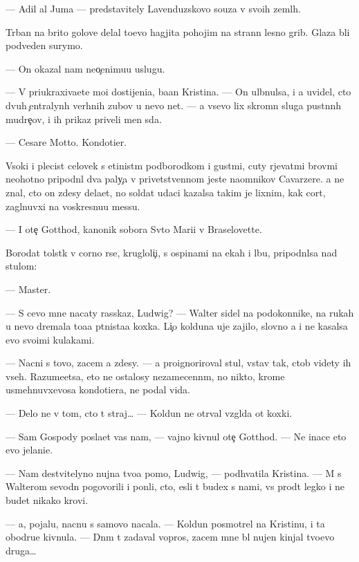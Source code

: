 \documentclass[10pt]{book}
\begin{document}
— Adil al Juma — predstavitely Lavenduzskovo so{\y}uza v svo{\y}ih zeml{\ia}h.

T{\iu}rban na brito{\y} golove delal to{\x}evo hagjita pohojim na strann{\yi}{\y} lesno{\y} grib. Glaza b{\yi}li podveden{\yi} surymo{\y}.

— On okazal nam neo{\c}enimu{\y}u uslugu.

— V{\yi} priukraxiva{\y}ete mo{\y}i dostijeni{\y}a, ba{\y}an Kristina. — On ul{\yi}bnulsa, i {\y}a uvidel, cto dvuh {\c}entralyn{\yi}h verhnih zubov u nevo net. — {\Y}a vsevo lix skromn{\yi}{\y} sluga pust{\yi}nn{\yi}h mudre{\c}ov, i ih prikaz{\yi} priveli men{\ia} s{\iu}da.

— Cesare Motto. Kondotier.

V{\yi}soki{\y} i plecist{\yi}{\y} celovek s {\x}etinist{\yi}m podborodkom i gust{\yi}mi, cuty r{\yi}jevat{\yi}mi brov{\ia}mi neohotno pripodn{\ia}l dva paly{\c}a v privetstvennom jeste na{\y}omnikov Cavarzere. {\Y}a ne znal, cto on zdesy dela{\y}et, no soldat udaci kazalsa takim je lixnim, kak cort, zagl{\ia}nuvxi{\y} na voskresnu{\y}u messu.

— I ote{\c} Gotthod, kanonik sobora Sv{\ia}to{\y} Mari{\y}i v Braselovette.

Borodat{\yi}{\y} tolst{\ia}k v corno{\y} r{\ia}se, krugloli{\c}i{\y}, s ospinami na {\x}ekah i lbu, pripodn{\ia}lsa nad stulom:

— Master.

— S cevo mne nacaty rasskaz, Ludwig? — Walter sidel na podokonnike, na rukah u nevo dremala to{\x}a{\y}a p{\ia}tnista{\y}a koxka. Li{\c}o kolduna uje zajilo, slovno {\y}a i ne kasalsa {\y}evo svo{\y}imi kulakami.

— Nacni s tovo, zacem {\y}a zdesy. — {\Y}a proignoriroval stul, vstav tak, ctob{\yi} videty ih vseh. Razume{\y}etsa, eto ne ostalosy nezamecenn{\yi}m, no nikto, krome usmehnuvxevosa kondotiera, ne podal vida.

— Delo ne v tom, cto t{\yi} straj… — Koldun ne otr{\yi}val vzgl{\ia}da ot koxki.

— Sam Gospody pos{\yi}la{\y}et vas nam, — vajno kivnul ote{\c} Gotthod. — Ne inace eto {\y}evo jelani{\y}e.

— Nam de{\y}stvitelyno nujna tvo{\y}a pomo{\x}, Ludwig, — podhvatila Kristina. — M{\yi} s Walterom sevodn{\ia} pogovorili i pon{\ia}li, cto, {\y}esli t{\yi} budex s nami, vs{\e} pro{\y}d{\e}t legko i ne budet nikako{\y} krovi.

— {\Y}a, pojalu{\y}, nacnu s samovo nacala. — Koldun posmotrel na Kristinu, i ta obodr{\ia}{\y}u{\x}e kivnula. — Dn{\e}m t{\yi} zadaval vopros, zacem mne b{\yi}l nujen kinjal tvo{\y}evo druga…
\end{document}
